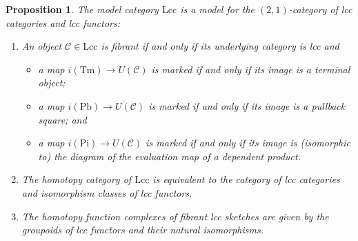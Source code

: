 \documentclass[a4paper]{article}
\newtheorem{proposition}[theorem]{Proposition}
\theoremstyle{remark}
\theoremstyle{definition}
\begin{document}
\begin{proposition}
  \label{prop:lcc-model-cat}
  The model category $\mathrm{Lcc}$ is a model for the $(2, 1)$-category of lcc categories and lcc functors:
  \begin{enumerate}[label={(\arabic*)}]
    \item
      \label{itm:lcc-fibrant-objects}
      An object $\mathcal{C} \in \mathrm{Lcc}$ is fibrant if and only if its underlying category is lcc and
      \begin{itemize}
        \item
          a map $i(\mathrm{Tm}) \rightarrow U(\mathcal{C})$ is marked if and only if its image is a terminal object;
        \item
          a map $i(\mathrm{Pb}) \rightarrow U(\mathcal{C})$ is marked if and only if its image is a  pullback square; and
        \item
          a map $i(\mathrm{Pi}) \rightarrow U(\mathcal{C})$ is marked if and only if its image is (isomorphic to) the diagram of the evaluation map of a dependent product.
      \end{itemize}
    \item
      \label{itm:lcc-homotopy-category}
      The homotopy category of $\mathrm{Lcc}$ is equivalent to the category of lcc categories and isomorphism classes of lcc functors.
    \item
      \label{itm:lcc-homotopy-function-complexes}
      The homotopy function complexes of fibrant lcc sketches are given by the groupoids of lcc functors and their natural isomorphisms.
  \end{enumerate}
\end{proposition}
\end{document}
